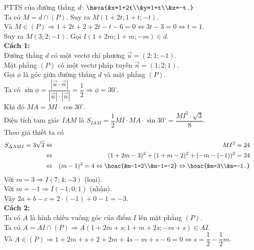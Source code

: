 \begin{ex}
{\begin{center}
\begin{tikzpicture}[line cap=round,line join=round,font=\footnotesize,>=stealth,scale=.8]
			\end{tikzpicture}
		\end{center}
		PTTS của đường thẳng $d\colon \heva{&x=1+2t\\&y=1+t\\&z=-t.}$\\
		Ta có $M=d\cap(P)$. Suy ra $M(1+2t;1+t;-t)$.\\
		Và $M \in(P) \Rightarrow 1+2 t+2+2 t-t-6=0 \Leftrightarrow 3 t-3=0 \Leftrightarrow t=1$.\\
		Suy ra $M(3;2;-1)$.
		Gọi $I(1+2m;1+m;-m) \in d$.\\
		{\bf Cách 1:}\\
		Đường thẳng $d$ có một vectơ chỉ phương $\overrightarrow{u}=(2;1;-1)$.\\
		Mặt phẳng $(P)$ có một vectơ pháp tuyến $\overrightarrow{n}=(1;2;1)$.\\
		Gọi $\phi$ là góc giữa đường thẳng $ d $ và mặt phẳng $(P)$.\\
		Ta có $\sin \phi =\dfrac{\left|\overrightarrow{u}\cdot \overrightarrow{n} \right|}{\left|\overrightarrow{u} \right|\cdot \left| \overrightarrow{n} \right|} =\dfrac{1}{2}\Rightarrow \phi=30^{\circ} $.\\
		Khi đó $ MA=MI \cdot \cos 30^{\circ} $.\\
		Diện tích tam giác $IAM$ là $S_{IAM}=\dfrac{1}{2}MI \cdot MA\cdot\sin {30^\circ}=\dfrac{MI^2\cdot \sqrt{3}}{8}$.\\
		Theo giả thiết ta có
		\allowdisplaybreaks
		\begin{eqnarray*}
			S_{\Delta AMI}=3\sqrt{3} &\Leftrightarrow& MI^2=24\\
			&\Leftrightarrow&(1+2m-3)^2+(1+m-2)^2+(-m-(-1))^2=24\\
			&\Leftrightarrow&  (m-1)^2=4 \Leftrightarrow\hoac{&m-1=2\\&m-1=-2} \Leftrightarrow \hoac{&m=3\\&m=-1.}
		\end{eqnarray*}
		Với $m=3 \Rightarrow I(7;4;-3)$ (loại).\\
		Với $m=-1 \Rightarrow I(-1;0;1)$ (nhận).\\
		Vậy $2 a+b-c=2 \cdot(-1)+0-1=-3$.\\
		{\bf Cách 2:}\\
		Ta có $A$ là hình chiếu vuông góc của điểm $I$ lên mặt phẳng $(P)$.\\
		Ta có $A=A I \cap(P) \Rightarrow A(1+2 m+s;1+m+2s;-m+s) \in A I$.\\
		Và $A \in(P) \Rightarrow 1+2 m+s+2+2 m+4 s-m+s-6=0 \Leftrightarrow s=\dfrac{1}{2}-\dfrac{1}{2} m$.\\
}
\end{ex}
